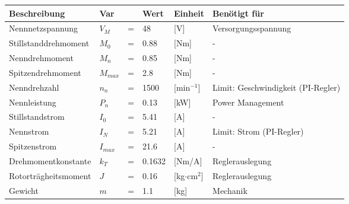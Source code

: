 \begin{tabularx}{\textwidth}{|lllllX|}
\hline
\textbf{Beschreibung} & \textbf{Var} & & \textbf{Wert} & \textbf{Einheit} & \textbf{Benötigt für} \\
\hline
Nennnetzspannung & $V_M$ & = & 48 & [V] & Versorgungsspannung\\
Stillstanddrehmoment & $M_0$ & = & 0.88 & [Nm] & -\\
Nenndrehmoment & $M_n$ & = & 0.85 & [Nm] & -\\
Spitzendrehmoment & $M_{max}$ & = & 2.8 & [Nm] & -\\
Nenndrehzahl & $n_n$ & = & 1500 & [min$^{-1}$] & Limit: Geschwindigkeit (PI-Regler)\\
Nennleistung & $P_n$ & = & 0.13 & [kW] & Power Management\\
Stillstandstrom & $I_0$ & = & 5.41 & [A] & -\\
Nennstrom & $I_N$ & = & 5.21 & [A] & Limit: Strom (PI-Regler)\\
Spitzenstrom & $I_{max}$ & = & 21.6 & [A] & -\\
Drehmomentkonstante & $k_T$ & = & 0.1632 & [Nm/A] & Reglerauslegung\\
Rotorträgheitsmoment & $J$ & = & 0.16 & [kg$\cdot$cm$^2$] & Reglerauslegung\\
Gewicht & $m$ & = & 1.1 & [kg] & Mechanik\\
\hline
\end{tabularx}